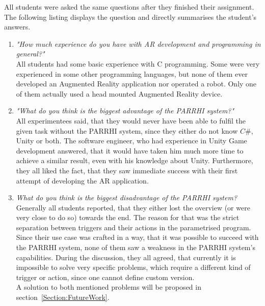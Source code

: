 All students were asked the same questions after they finished their assignment. The following listing displays the question and directly summarises the student's answers.
\begin{enumerate}
	\item \textit{"How much experience do you have with AR development and programming in general?"}\\
	All students had some basic experience with C programming. Some were very experienced in some other programming languages, but none of them ever developed an Augmented Reality application nor operated a robot. Only one of them actually used a head mounted Augmented Reality device.
	\item \textit{"What do you think is the biggest advantage of the PARRHI system?"}\\
	All experimentees said, that they would never have been able to fulfil the given task without the PARRHI system, since they either do not know $C\#$, Unity or both. The software engineer, who had experience in Unity Game development answered, that it would have taken him much more time to achieve a similar result, even with his knowledge about Unity. Furthermore, they all liked the fact, that they saw immediate success with their first attempt of developing the AR application.
	\item \textit{What do you think is the biggest disadvantage of the PARRHI system?}\\
	Generally all students reported, that they either lost the overview (or were very close to do so) towards the end. The reason for that was the strict separation between triggers and their actions in the parametrised program.
	\\Since their use case was crafted in a way, that it was possible to succeed with the PARRHI system, none of them saw a weakness in the PARRHI system's capabilities. During the discussion, they all agreed, that currently it is impossible to solve very specific problems, which require a different kind of trigger or action, since one cannot define custom version.\\A solution to both mentioned problems will be proposed in section~\ref{Section:FutureWork}.
\end{enumerate}
 
 
 
 
 
 
 
 
 
 
 
 
 
 
 
 
 
 
 